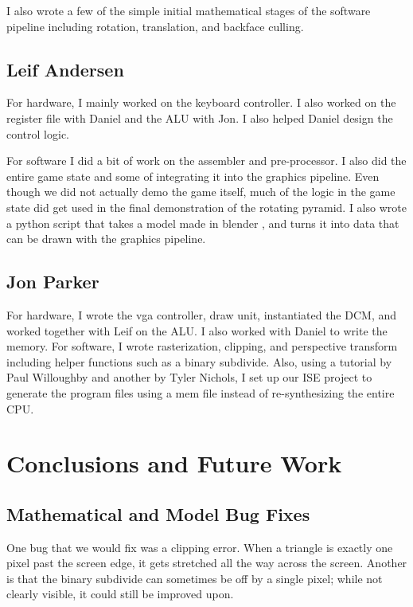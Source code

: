 \documentclass[onecolumn]{IEEEtran}
\begin{document}
I also wrote a few of the simple initial mathematical stages of the software pipeline including rotation, translation, and backface culling.

\subsection{Leif Andersen}
For hardware, I mainly worked on the keyboard controller.  I also worked on the register file with Daniel and the ALU with Jon.  I also helped Daniel design the control logic.

For software I did a bit of work on the assembler and pre-processor.  I also did the entire game state and some of integrating it into the graphics pipeline.  Even though we did not actually demo the game itself, much of the logic in the game state did get used in the final demonstration of the rotating pyramid.  I also wrote a python script that takes a model made in blender \cite{blender}, and turns it into data that can be drawn with the graphics pipeline.

\subsection{Jon Parker}
For hardware, I wrote the vga controller, draw unit, instantiated the DCM, and worked together with Leif on the ALU.  I also worked with Daniel to write the memory.  For software, I wrote rasterization, clipping, and perspective transform including helper functions such as a binary subdivide.  Also, using a tutorial by Paul Willoughby and another by Tyler Nichols, I set up our ISE project to generate the program files using a mem file instead of re-synthesizing the entire CPU.


\section{Conclusions and Future Work}
\subsection{Mathematical and Model Bug Fixes}
One bug that we would fix was a clipping error. When a triangle is exactly one pixel past the screen edge, it gets stretched all the way across the screen.  Another is that the binary subdivide can sometimes be off by a single pixel; while not clearly visible, it could still be improved upon.
\end{document}
